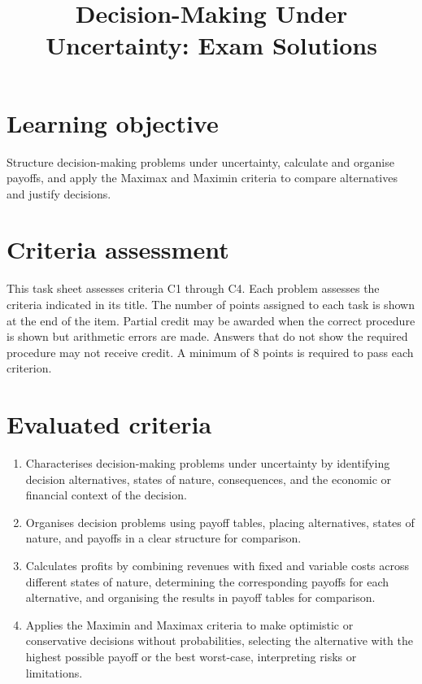 \makeatletter
{}
\makeatother



\title{Decision-Making Under Uncertainty: Exam Solutions}
\author{}
\date{}


	\maketitle
	\vspace{-2cm}
	\setcounter{tocdepth}{1}
	\setcounter{secnumdepth}{2}
	\label{toc}
	\tableofcontents

	\section*{Learning objective}
	Structure decision-making problems under uncertainty, calculate and organise payoffs, and apply the Maximax and Maximin criteria to compare alternatives and justify decisions.

	\section*{Criteria assessment}
	This task sheet assesses criteria C1 through C4. Each problem assesses the criteria indicated in its title. The number of points assigned to each task is shown at the end of the item. Partial credit may be awarded when the correct procedure is shown but arithmetic errors are made. Answers that do not show the required procedure may not receive credit. A minimum of 8 points is required to pass each criterion.

	\section*{Evaluated criteria}
	\begin{enumerate}[label=\textbf{C\arabic*}]
	    \item Characterises decision-making problems under uncertainty by identifying decision alternatives, states of nature, consequences, and the economic or financial context of the decision.
	    \item Organises decision problems using payoff tables, placing alternatives, states of nature, and payoffs in a clear structure for comparison.
	    \item Calculates profits by combining revenues with fixed and variable costs across different states of nature, determining the corresponding payoffs for each alternative, and organising the results in payoff tables for comparison.
	    \item Applies the Maximin and Maximax criteria to make optimistic or conservative decisions without probabilities, selecting the alternative with the highest possible payoff or the best worst-case, interpreting risks or limitations.
	\end{enumerate}


